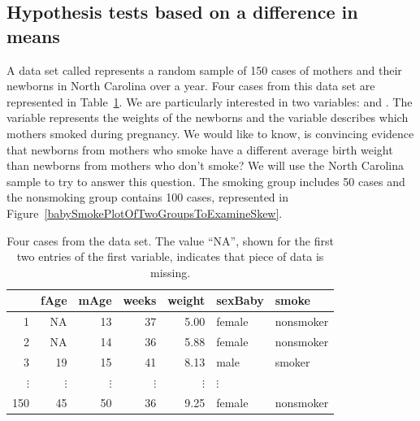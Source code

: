 %
%












\subsection{Hypothesis tests based on a difference in means}


A data set called  represents a random sample of 150 cases of mothers and their newborns in North Carolina over a year. Four cases from this data set are represented in Table~\ref{babySmokeDF}. We are particularly interested in two variables:  and . The  variable represents the weights of the newborns and the  variable describes which mothers smoked during pregnancy. We would like to know, is convincing evidence that newborns from mothers who smoke have a different average birth weight than newborns from mothers who don't smoke? We will use the North Carolina sample to try to answer this question. The smoking group includes 50 cases and the nonsmoking group contains 100 cases, represented in Figure~\ref{babySmokePlotOfTwoGroupsToExamineSkew}.

\begin{table}
\centering
\begin{tabular}{rrrrrll}
  \hline
 & fAge & mAge & weeks & weight & sexBaby & smoke \\ 
  \hline
1 & NA & 13 &  37 & 5.00 & female & nonsmoker \\ 
  2 & NA & 14 &  36 & 5.88 & female & nonsmoker \\ 
  3 & 19 & 15 &  41 & 8.13 & male & smoker \\ 
  $\vdots$ &   $\vdots$ &   $\vdots$ &   $\vdots$ &   $\vdots$ &   $\vdots$ \\
  150 & 45 & 50 &  36 & 9.25 & female & nonsmoker \\ 
   \hline
\end{tabular}
\caption{Four cases from the  data set. The value ``NA'', shown for the first two entries of the first variable, indicates that piece of data is missing.}
\label{babySmokeDF}
\end{table}

